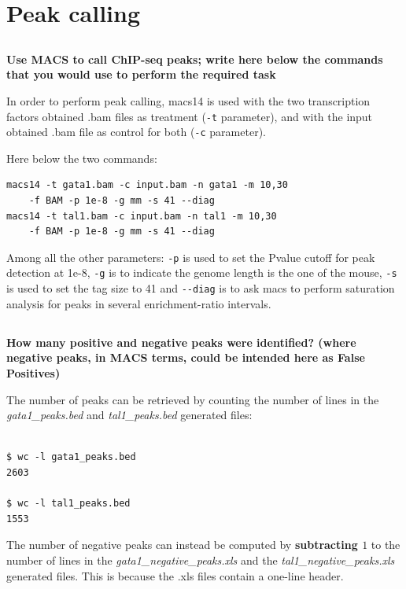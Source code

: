 \documentclass[12pt, a4paper]{article}
\begin{document}
\section{Peak calling}

\subsection{}
\textbf{Use MACS to call ChIP-seq peaks; write here below the commands that you would use to perform the required task}

In order to perform peak calling, macs14 is used with the two transcription factors obtained .bam files as treatment (\verb|-t| parameter), and with the input obtained .bam file as control for both (\verb|-c| parameter).

Here below the two commands:

\begin{verbatim}
macs14 -t gata1.bam -c input.bam -n gata1 -m 10,30
    -f BAM -p 1e-8 -g mm -s 41 --diag
macs14 -t tal1.bam -c input.bam -n tal1 -m 10,30
    -f BAM -p 1e-8 -g mm -s 41 --diag
\end{verbatim}

Among all the other parameters: \verb|-p| is used to set the Pvalue cutoff for peak detection at 1e-8, \verb|-g| is to indicate the genome length is the one of the mouse, \verb|-s| is used to set the tag size to 41 and \verb|--diag| is to ask macs to perform saturation analysis for peaks in several enrichment-ratio intervals.

\subsection{}
\textbf{How many positive and negative peaks were identified? (where negative peaks, in MACS terms, could be intended here as False Positives)}

The number of peaks can be retrieved by counting the number of lines in the \textit{gata1\_peaks.bed} and \textit{tal1\_peaks.bed} generated files:

\begin{verbatim}

$ wc -l gata1_peaks.bed
2603

$ wc -l tal1_peaks.bed
1553

\end{verbatim}

The number of negative peaks can instead be computed by \textbf{subtracting $1$} to the number of lines in the \textit{gata1\_negative\_peaks.xls} and the \textit{tal1\_negative\_peaks.xls} generated files. This is because the .xls files contain a one-line header.
\end{document}

